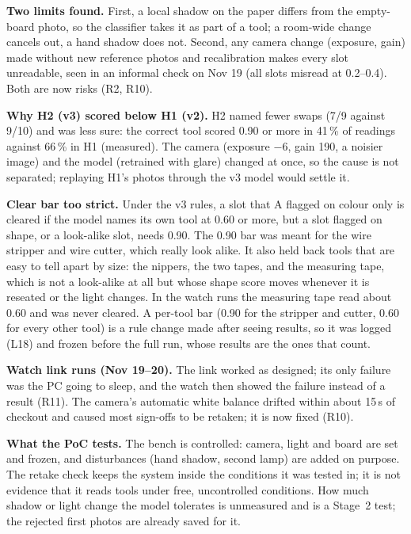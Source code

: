 \textbf{Two limits found.} First, a local shadow on the paper differs from
the empty-board photo, so the classifier takes it as part of a tool; a
room-wide change cancels out, a hand shadow does not. Second, any camera
change (exposure, gain) made without new reference photos and recalibration
makes every slot unreadable, seen in an informal check on Nov 19 (all
slots misread at 0.2--0.4). Both are now risks (R2, R10).

\textbf{Why H2 (v3) scored below H1 (v2).} H2 named fewer swaps (7/9
against 9/10) and was less sure: the correct tool scored 0.90 or more in
41\,\% of readings against 66\,\% in H1 (measured). The camera (exposure
$-6$, gain 190, a noisier image) and the model (retrained with glare)
changed at once, so the cause is not separated; replaying H1's photos
through the v3 model would settle it.

\textbf{Clear bar too strict.} Under the v3 rules, a slot that A flagged
on colour only is cleared if the model names its own tool at 0.60 or more,
but a slot flagged on shape, or a look-alike slot, needs 0.90. The 0.90 bar
was meant for the wire stripper and wire cutter, which really look alike.
It also held back tools that are easy to tell apart by size: the nippers,
the two tapes, and the measuring tape, which is not a look-alike at all but
whose shape score moves whenever it is reseated or the light changes. In
the watch runs the measuring tape read about 0.60 and was never cleared. A
per-tool bar (0.90 for the stripper and cutter, 0.60 for every other tool)
is a rule change made after seeing results, so it was logged (L18) and
frozen before the full run, whose results are the ones that count.

\textbf{Watch link runs (Nov 19--20).} The link worked as designed; its
only failure was the PC going to sleep, and the watch then showed the
failure instead of a result (R11). The camera's automatic white balance
drifted within about 15\,s of checkout and caused most sign-offs to be
retaken; it is now fixed (R10).

\textbf{What the PoC tests.} The bench is controlled: camera, light and
board are set and frozen, and disturbances (hand shadow, second lamp) are
added on purpose. The retake check keeps the system inside the conditions
it was tested in; it is not evidence that it reads tools under free,
uncontrolled conditions. How much shadow or light change the model
tolerates is unmeasured and is a Stage~2 test; the rejected first photos
are already saved for it.

